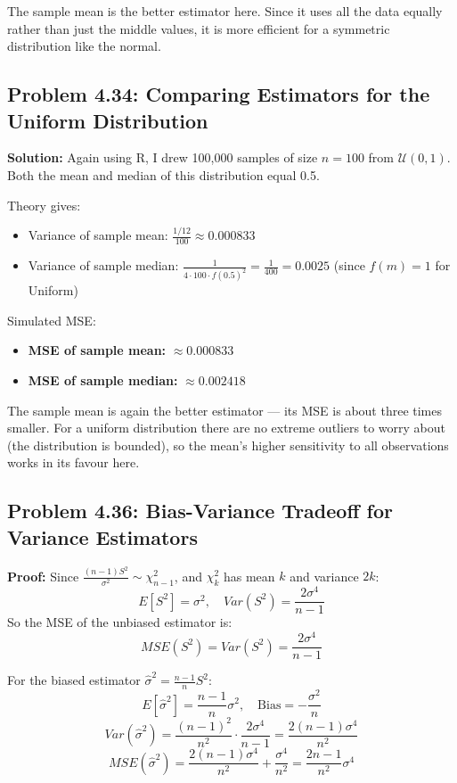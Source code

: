 \documentclass[11pt, a4paper]{article}
\begin{document}
The sample mean is the better estimator here. Since it uses all the data equally rather than just the middle values, it is more efficient for a symmetric distribution like the normal.

\subsection{Problem 4.34: Comparing Estimators for the Uniform Distribution}
\textbf{Solution:}
Again using R, I drew 100,000 samples of size $n=100$ from $\mathcal{U}(0,1)$. Both the mean and median of this distribution equal 0.5.

Theory gives:
\begin{itemize}
    \item Variance of sample mean: $\frac{1/12}{100} \approx 0.000833$
    \item Variance of sample median: $\frac{1}{4 \cdot 100 \cdot f(0.5)^2} = \frac{1}{400} = 0.0025$ (since $f(m)=1$ for Uniform)
\end{itemize}

Simulated MSE:
\begin{itemize}
    \item \textbf{MSE of sample mean:} $\approx 0.000833$
    \item \textbf{MSE of sample median:} $\approx 0.002418$
\end{itemize}

The sample mean is again the better estimator — its MSE is about three times smaller. For a uniform distribution there are no extreme outliers to worry about (the distribution is bounded), so the mean's higher sensitivity to all observations works in its favour here.

\newpage
\subsection{Problem 4.36: Bias-Variance Tradeoff for Variance Estimators}
\textbf{Proof:}
Since $\frac{(n-1)S^2}{\sigma^2} \sim \chi^2_{n-1}$, and $\chi^2_k$ has mean $k$ and variance $2k$:
$$E[S^2] = \sigma^2, \quad Var(S^2) = \frac{2\sigma^4}{n-1}$$
So the MSE of the unbiased estimator is:
$$MSE(S^2) = Var(S^2) = \frac{2\sigma^4}{n-1}$$

For the biased estimator $\hat{\sigma}^2 = \frac{n-1}{n} S^2$:
$$E[\hat{\sigma}^2] = \frac{n-1}{n}\sigma^2, \quad \text{Bias} = -\frac{\sigma^2}{n}$$
$$Var(\hat{\sigma}^2) = \frac{(n-1)^2}{n^2} \cdot \frac{2\sigma^4}{n-1} = \frac{2(n-1)\sigma^4}{n^2}$$
$$MSE(\hat{\sigma}^2) = \frac{2(n-1)\sigma^4}{n^2} + \frac{\sigma^4}{n^2} = \frac{2n-1}{n^2}\sigma^4$$
\end{document}
